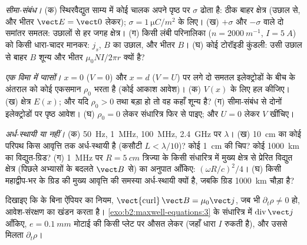 \begin{exercise}[$\star\star$]\label{exo:b2:maxwell-equations:6}
\emph{सीमा-संबंध।} (क) स्थिरवैद्युत साम्य में कोई चालक अपने पृष्ठ पर
$\sigma$ ढोता है: ठीक बाहर क्षेत्र (उछाल से, और भीतर $\vect E = \vect 0$ लेकर);
$\sigma = \qty{1}{\micro C/m^2}$ के लिए। (ख) $+\sigma$ और $-\sigma$ वाले दो
समांतर समतल: उछालों से हर जगह क्षेत्र।
(ग) किसी लंबी परिनालिका ($n = \qty{2000}{m^{-1}}$, $I = \qty{5}{A}$) को किसी धारा-चादर
मानकर: $j_s$, $B$ का उछाल, और भीतर $B$। (घ) कोई टोरॉइडी कुंडली: उसी उछाल से बाहर $B$
शून्य और भीतर $\mu_0NI/2\pi r$ क्यों है?
\end{exercise}

\begin{exercise}[$\star\star$]\label{exo:b2:maxwell-equations:7}
\emph{एक विमा में प्वासों।} $x = 0$ ($V = 0$) और $x = d$ ($V = U$) पर लगे
दो समतल इलेक्ट्रोडों के बीच के अंतराल को कोई एकसमान  $\rho_0$
भरता है (कोई आकाश आवेश)। (क) $V(x)$ के लिए  हल कीजिए। (ख) क्षेत्र
$E(x)$; और यदि $\rho_0 > 0$ तथा बड़ा हो तो वह कहाँ शून्य है? (ग) सीमा-संबंध से
दोनों इलेक्ट्रोडों पर पृष्ठ आवेश। (घ) $\rho_0 = 0$ लेकर
संधारित्र फिर से पाइए; और $U = 0$ लेकर $V$ खींचिए।
\end{exercise}

\begin{exercise}[$\star\star$]\label{exo:b2:maxwell-equations:8}
\emph{अर्ध-स्थायी या नहीं।} (क) \qty{50}{Hz}, \qty{1}{MHz},
\qty{100}{MHz}, \qty{2.4}{GHz} पर $\lambda$। (ख) \qty{10}{cm} का कोई
परिपथ किस आवृत्ति तक अर्ध-स्थायी है (कसौटी $L < \lambda/10$)? कोई \qty{1}{cm} की चिप? कोई
\qty{1000}{km} का विद्युत-ग्रिड? (ग) \qty{1}{MHz} पर $R = \qty{5}{cm}$ त्रिज्या के किसी संधारित्र में
मुख्य क्षेत्र से प्रेरित विद्युत क्षेत्र (पिछले अभ्यासों के
बदलते $\vect B$ से) का अनुपात आँकिए: $(\omega R/c)^2
/4$। (घ) किसी महाद्वीप-भर के ग्रिड की मुख्य आवृत्ति की समस्या
अर्ध-स्थायी क्यों है, जबकि ग्रिड \qty{1000}{km} चौड़ा है?
\end{exercise}

\begin{exercise}[$\star\star$]\label{exo:b2:maxwell-equations:9}
दिखाइए कि  के बिना ऐंपियर का नियम, $\operatorname{\vect{curl}}
\vect B = \mu_0\vect j$, जब भी $\partial_t\rho
\ne 0$ हो, आवेश-संरक्षण का खंडन करता है। \cref{exo:b2:maxwell-equations:3} के संधारित्र में
$\operatorname{div}\vect j$ आँकिए, $e = \qty{0.1}{mm}$ मोटाई की किसी प्लेट पर औसत
लेकर (जहाँ धारा $I$ रुकती है), और उससे मिलता $\partial_t\rho$।
\end{exercise}

